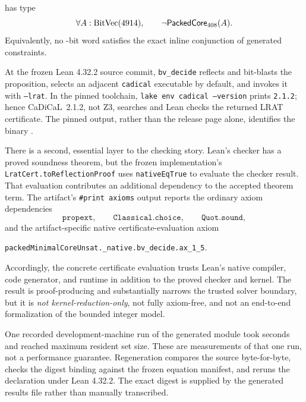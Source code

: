 \documentclass[11pt,twoside]{article}
\theoremstyle{remark}
\begin{document}
\begin{tcolorbox}[colback=BoxTint,colframe=MutedTeal,title={Lean theorem:
packed core UNSAT}]
\PackedTheorem{} has type
\[
  \forall A:\operatorname{BitVec}(4914),
  \qquad \neg\mathsf{PackedCore}_{408}(A).
\]
Equivalently, no \PackedWidth-bit word satisfies the exact inline conjunction
of \PackedConstraintCount{} generated constraints.
\end{tcolorbox}

At the frozen Lean 4.32.2 source commit, \texttt{bv\_decide} reflects and
bit-blasts the proposition, selects an adjacent \texttt{cadical} executable by
default, and invokes it with \texttt{--lrat}.  In the pinned toolchain,
\texttt{lake env cadical --version} prints \texttt{2.1.2}; hence
CaDiCaL~2.1.2, not Z3, searches and Lean checks the returned LRAT certificate.
The pinned output, rather than the release page alone, identifies the binary
\cite{leanBVDecide432,CruzFilipeEtAl2017,cadical212}.

There is a second, essential layer to the checking story.  Lean's checker has
a proved soundness theorem, but the frozen implementation's
\texttt{LratCert.toReflectionProof} uses \texttt{nativeEqTrue} to evaluate the
checker result.  That evaluation contributes an additional dependency to the
accepted theorem term.  The artifact's \texttt{\#print axioms} output reports
the ordinary axiom dependencies
\[
  \texttt{propext},\qquad
  \texttt{Classical.choice},\qquad
  \texttt{Quot.sound},
\]
and the artifact-specific native certificate-evaluation axiom
\begin{center}
  \small\nolinkurl{packedMinimalCoreUnsat._native.bv_decide.ax_1_5}.
\end{center}
Accordingly, the concrete certificate evaluation trusts Lean's native
compiler, code generator, and runtime in addition to the proved checker and
kernel.  The result is proof-producing and substantially narrows the trusted
solver boundary, but it is \emph{not kernel-reduction-only}, not fully
axiom-free, and not an end-to-end formalization of the bounded integer model.

One recorded development-machine run of the generated module took
\PackedLeanSeconds{} seconds and reached \PackedLeanMaxRSS{} maximum resident
set size.  These are measurements of that one run, not a performance
guarantee.  Regeneration compares the source byte-for-byte, checks the
digest binding against the frozen equation manifest, and reruns the
declaration under Lean 4.32.2.  The exact digest is supplied by the generated
results file rather than manually transcribed.
\end{document}
